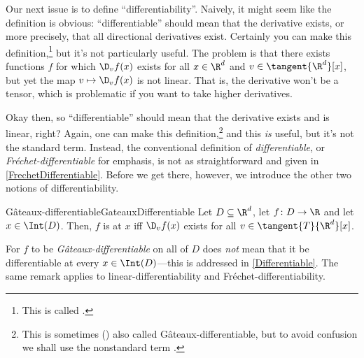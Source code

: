 Our next issue is to define ``differentiability''.  Naively, it might seem like the definition is obvious:  ``differentiable'' should mean that the derivative exists, or more precisely, that all directional derivatives exist.  Certainly you can make this definition,\footnote{This is called .} but it's not particularly useful.  The problem is that there exists functions $f$ for which $\D _vf(x)$ exists for all $x\in \R ^d$ and $v\in \tangent{\R ^d}[x]$, but yet the map $v\mapsto \D _vf(x)$ is not linear.  That is, the derivative won't be a tensor, which is problematic if you want to take higher derivatives.

Okay then, so ``differentiable'' should mean that the derivative exists and is linear, right?  Again, one can make this definition,\footnote{This is sometimes (\cite[pg.~117]{Drabek}) also called Gâteaux-differentiable, but to avoid confusion we shall use the nonstandard term .} and this \emph{is} useful, but it's not the standard term.  Instead, the conventional definition of \emph{differentiable}, or \emph{Fréchet-differentiable} for emphasis, is not as straightforward and given in \cref{FrechetDifferentiable}.  Before we get there, however, we introduce the other two notions of differentiability.
\begin{dfn}{Gâteaux-differentiable}{GateauxDifferentiable}
	Let $D\subseteq \R ^d$, let $f\colon D\rightarrow \R$ and let $x\in \Int (D)$.  Then, $f$ is  at $x$ iff $\D _vf(x)$ exists for all $v\in \tangent{T}{\R ^d}[x]$.
	\begin{wrn}
		For $f$ to be \emph{Gâteaux-differentiable} on all of $D$ does \emph{not} mean that it be differentiable at every $x\in \Int (D)$---this is addressed in \cref{Differentiable}.  The same remark applies to linear-differentiability and Fréchet-differentiability.
	\end{wrn}
\end{dfn}
